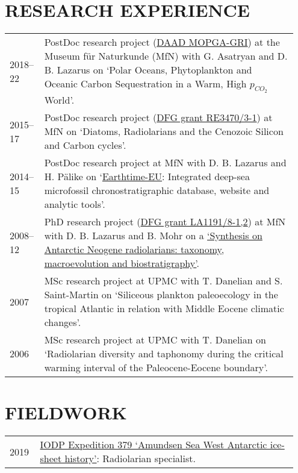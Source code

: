 \documentclass[11pt, a4paper]{article}
\begin{document}
\section{RESEARCH EXPERIENCE}
\begin{longtable}{p{0.1\linewidth} P{0.85\linewidth}}
2018--22 & PostDoc research project (\href{https://www.daad.de/medien/hochschulen/regional/europa/mopga/projektbeschreibungen_englisch_15-05-2018.pdf}{DAAD MOPGA-GRI}) at the Museum f\"{u}r Naturkunde (MfN) with G. Asatryan and D. B. Lazarus on `Polar Oceans, Phytoplankton and Oceanic Carbon Sequestration in a Warm, High $p_{CO_2}$ World'.\\
2015--17 & PostDoc research project (\href{http://gepris.dfg.de/gepris/projekt/279867559}{DFG grant RE3470/3-1}) at MfN on `Diatoms, Radiolarians and the Cenozoic Silicon and Carbon cycles'.\\
2014--15 & PostDoc research project at MfN with D. B. Lazarus and H. P\"{a}like on `\href{http://earthtime-eu.eu/earthtime/?page_id=686}{Earthtime-EU}: Integrated deep-sea microfossil chronostratigraphic database, website and analytic tools'.\\
2008--12 & PhD research project (\href{http://gepris.dfg.de/gepris/projekt/84744046}{DFG grant LA1191/8-1,2}) at MfN with D. B. Lazarus and B. Mohr on a \href{https://doi.org/10.18452/16985}{`Synthesis on Antarctic Neogene radiolarians: taxonomy, macroevolution and biostratigraphy'}.\\
2007 & MSc research project at UPMC with T. Danelian and S. Saint-Martin on `Siliceous plankton paleoecology in the tropical Atlantic in relation with Middle Eocene climatic changes'.\\
2006 & MSc research project at UPMC with T. Danelian on `Radiolarian diversity and taphonomy during the critical warming interval of the Paleocene-Eocene boundary'.\\
\end{longtable}

\section{FIELDWORK}
\begin{longtable}{p{0.1\linewidth} P{0.85\linewidth}}
2019 & \href{https://iodp.tamu.edu/scienceops/expeditions/amundsen_sea_ice_sheet_history.html}{IODP Expedition 379 `Amundsen Sea West Antarctic ice-sheet history'}: Radiolarian specialist.\\
\end{longtable}
\end{document}
